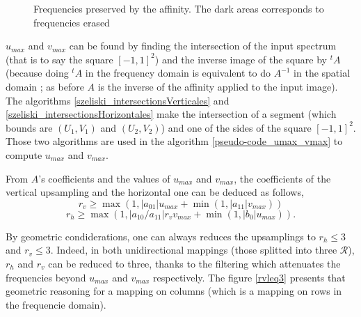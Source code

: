 \begin{figure}
		\caption{Frequencies preserved by the affinity. The dark areas corresponds to frequencies erased}
		\label{uMax_vMax}
		\end{figure}
		
 
		 $u_{max}$ and $v_{max}$ can be found by finding the intersection of the input spectrum (that is to say the square $[-1,1]^2$) and the inverse image of the square by $^t\!A$ (because doing  $^t\!A$ in the frequency domain is equivalent to do $A^{-1}$ in the spatial domain ; as before $A$ is the inverse of the affinity applied to the input image). The algorithms \ref{szeliski_intersectionsVerticales} and \ref{szeliski_intersectionsHorizontales} make the intersection of a segment (which bounds are $(U_1,V_1)$ and $(U_2,V_2)$) and one of the sides of the square $[-1,1]^2$. Those two algorithms are used in the algorithm \ref{pseudo-code_umax_vmax} to compute $u_{max}$ and $v_{max}$.


		
		From $A$'s coefficients and the values of $u_{max}$ and $v_{max}$, the coefficients of the vertical upsampling and the horizontal one can be deduced \cite{szeliski2010high} as follows,
		\[r_v \geq \max (1,|a_{01}|u_{max}+\min (1,|a_{11}|v_{max}))\]
		\[r_h \geq \max (1,|a_{10}/a_{11}|r_vv_{max}+\min (1,|b_0|u_{max})).\]


		By geometric condiderations, one can always reduces the upsamplings to $r_h \leq 3$ and $r_v \leq 3$. Indeed, in both unidirectional mappings (those splitted into three $\mathcal R$), $r_h$ and $r_v$ can be reduced to three, thanks to the filtering which attenuates the frequencies beyond $u_{max}$ and $v_{max}$ respectively. The figure \ref{rvleq3} presents that geometric reasoning for a mapping on columns (which is a mapping on rows in the frequencie domain).


